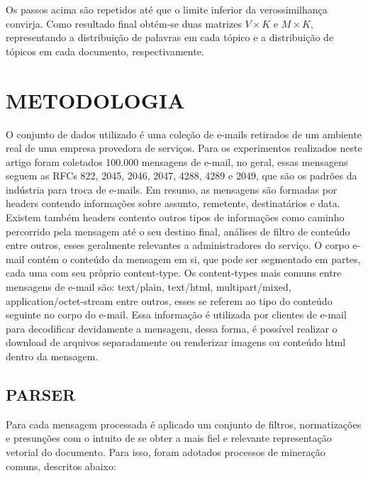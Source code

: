 \documentclass[12pt,a4paper]{article}
\begin{document}
Os passos acima são repetidos até que o limite inferior da verossimilhança convirja. Como resultado final obtém-se duas matrizes $V \times K$ e $M \times K$,
 representando  a distribuição de palavras em cada tópico e a distribuição de tópicos em cada documento, respectivamente.



\section{METODOLOGIA}
O conjunto de dados utilizado é uma coleção de e-mails retirados de um ambiente real de uma empresa provedora de serviços. 
 Para os experimentos realizados neste artigo foram coletados 100.000 mensagens de e-mail, no geral, essas mensagens seguem as RFCs 822, 2045, 2046, 2047, 4288, 4289 e 2049,
 que são os padrões da indústria para troca de e-mails.	Em resumo, as mensagens são formadas por headers contendo informações sobre assunto, remetente, destinatários e data.
 Existem também headers contento outros tipos de informações como caminho percorrido pela mensagem até o seu destino final, análises de filtro de conteúdo entre outros,
 esses geralmente relevantes a administradores do serviço. O corpo e-mail contém o conteúdo da mensagem em si, que pode ser segmentado em  partes, cada uma com seu próprio content-type. 
 Os content-types mais comuns entre mensagens de e-mail são: text/plain, text/html, multipart/mixed, application/octet-stream entre outros, esses se referem ao tipo do conteúdo seguinte no corpo do e-mail.
 Essa informação é utilizada por clientes de e-mail para decodificar devidamente a mensagem,
 dessa forma, é possível realizar o download de arquivos separadamente ou renderizar imagens ou conteúdo html dentro da mensagem.


\subsection{PARSER}
Para cada mensagem processada é aplicado um conjunto de filtros, normatizações e presunções com o intuito de se obter a mais fiel e relevante representação vetorial do documento.
 Para isso, foram adotados processos de mineração comuns, descritos abaixo:
\end{document}
